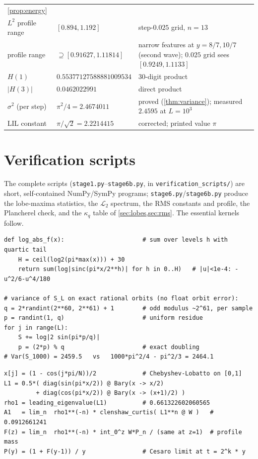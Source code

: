 \documentclass[11pt,oneside]{article}
\theoremstyle{definition}
\theoremstyle{remark}
\newcommand{\Lop}{\mathcal L}
\begin{document}
\begin{center}
\begin{tabular}{@{}lll@{}}
\cref{prop:energy}\\
$L^2$ profile range & $[0.894,1.192]$ & step-$0.025$ grid, $n=13$\\
profile range & $\supseteq[0.91627,1.11814]$ & narrow features at
$y=8/7,10/7$ (second wave); $0.025$ grid sees $[0.9249,1.1133]$\\
$H(1)$ & $0.55377127588881009534$ & 30-digit product\\
$|H(3)|$ & $0.0462022991$ & direct product\\
$\sigma^2$ (per step) & $\pi^2/4=2.4674011$ & proved
(\cref{thm:variance}); measured $2.4595$ at $L=10^3$\\
LIL constant & $\pi/\sqrt2=2.2214415$ & corrected; printed value $\pi$\\
\bottomrule
\end{tabular}
\end{center}

\section{Verification scripts}
\label{app:scripts}

The complete scripts (\texttt{stage1.py}--\texttt{stage6b.py}, in
\nolinkurl{verification_scripts/}) are short, self-contained NumPy/SymPy
programs; \texttt{stage6.py}/\texttt{stage6b.py} produce the lobe-maxima
statistics, the $\Lop_2$ spectrum, the RMS constants and profile, the
Plancherel check, and the $\kappa_q$ table of
\cref{sec:lobes,sec:rms}.  The essential kernels follow.

\begin{lstlisting}[style=pseudo,caption={Evaluation of $\log|f|$ and the
exact-orbit variance measurement}]
def log_abs_f(x):                      # sum over levels h with quartic tail
    H = ceil(log2(pi*max(x))) + 30
    return sum(log|sinc(pi*x/2**h)| for h in 0..H)   # |u|<1e-4: -u^2/6-u^4/180

# variance of S_L on exact rational orbits (no float orbit error):
q = 2*randint(2**60, 2**61) + 1        # odd modulus ~2^61, per sample
p = randint(1, q)                      # uniform residue
for j in range(L):
    S += log|2 sin(pi*p/q)|
    p = (2*p) % q                      # exact doubling
# Var(S_1000) = 2459.5   vs   1000*pi^2/4 - pi^2/3 = 2464.1
\end{lstlisting}

\begin{lstlisting}[style=pseudo,caption={Transfer operator: Perron root,
shell constant, and mantissa profile}]
x[j] = (1 - cos(j*pi/N))/2             # Chebyshev-Lobatto on [0,1]
L1 = 0.5*( diag(sin(pi*x/2)) @ Bary(x -> x/2)
         + diag(cos(pi*x/2)) @ Bary(x -> (x+1)/2) )
rho1 = leading_eigenvalue(L1)          # 0.661322602060565
A1   = lim_n  rho1**(-n) * clenshaw_curtis( L1**n @ W )   # 0.0912661241
F(z) = lim_n  rho1**(-n) * int_0^z W*P_n / (same at z=1)  # profile mass
P(y) = (1 + F(y-1)) / y                # Cesaro limit at t = 2^k * y
\end{lstlisting}
\end{document}
